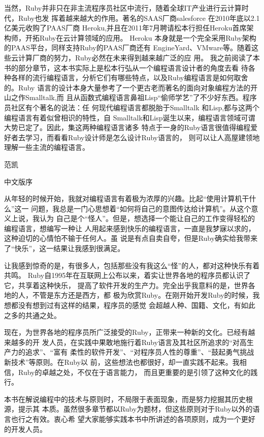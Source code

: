 \documentclass[11pt]{ctexart}
\begin{document}
当然，Ruby并非只在非主流程序员社区中流行，随着全球IT产业进行云计算时代，Ruby也发
挥着越来越大的作用。著名的SAAS厂商salesforce 在2010年底以2.1亿美元收购了PAAS厂商
Heroku,并且在2011年7月聘请松本行担任Heroku首席架构师，开拓Ruby在云计算领域的应用。
Heroku 本身就是一个完全采用Ruby架构的PAAS平台，同样支持Ruby的PAAS厂商还有
EngineYard、VMware等。随着这些云计算厂商的努力，Ruby必然在未来得到越来越广泛的应
用。
我之前阅读了本书的部分章节，这本书实际上是松本行弘从一个编程语言设计者的角度去看
待各种各样的流行编程语言，分析它们有哪些特点，以及Ruby编程语言是如何取舍的。Ruby
语言的设计本身大量参考了一个更古老而著名的面向对象编程方法的开山之作Smalltalk,而
且从函数式编程语言鼻祖Lisp“偷师学艺”了不少好东西。程序员社区有个著名的说法：任
何现代编程语言都脱胎于Smalltalk 和Lisp,都与这两个编程语言有着似曾相识的特性，自
Smalltalk和Lisp诞生以来，编程语言领域可谓大势已定了。因此，集这两种编程语言诸多
特点于一身的Ruby语言很值得编程爱好者去学习，而看看Ruby设计师是怎么设计Ruby语言的，
则可以让人高屋建领地理解一些主流的编程语言。

范凯
\newpage

中文版序

从年轻的时候开始，我就对编程语言有着极为浓厚的兴趣。比起“使用计算机干什么”这一
问题，我总是一门心思想着“如何将自己的意图传达给计算机”。从这个意义上说，我认为
自己是个“怪人”。但是，想选择一个能让自己的工作变得轻松的编程语言，想编写一种让
人用起来感到快乐的编程语言，一直是我梦寐以求的，这种迫切的心情怕不输于任何人。虽
说是有点自卖自夸，但是Ruby确实给我带来了“快乐”，这一结果让我感到很满足。

让我感到惊奇的是，有很多人，包括那些没有我这么“怪”的人，都对这种快乐有着共鸣。
Ruby自1995年在互联网上公布以来，着实让世界各地的程序员都认识了它，共享着这种快乐，
提高了软件开发的生产力。完全出乎我意料的是，世界各地的人，不管是东方还是西方，都
极为欣赏Ruby。在刚开始开发Ruby的时候，我想都没有想到过有这样的结果，程序员的感觉
会超越人种、国籍、文化，有如此之多的共通之处。

现在，为世界各地的程序员所广泛接受的Ruby，正带来一种新的文化。已经有越来越多的开
发人员，在实践中果敢地施行着Ruby语言及其社区所追求的“对高生产力的追求”、“富有
柔性的软件开发”、“对程序员人性的尊重”、“鼓起勇气挑战新技术”等原则。在Ruby以
前，这些想法也都很好，却一直实践不起来。我相信，Ruby的卓越之处，不仅在于语言能力，
而且更重要的是引领了这种文化的践行。

本书在解说编程中的技术与原则时，不局限于表面现象，而是努力挖掘其历史根源，提示其
本质。虽然很多章节都以Ruby为题材，但这些原则对于Ruby以外的语言也行之有效。衷心希
望大家能够实践本书中所讲述的各项原则，成为一个更好的开发人员。
\end{document}
